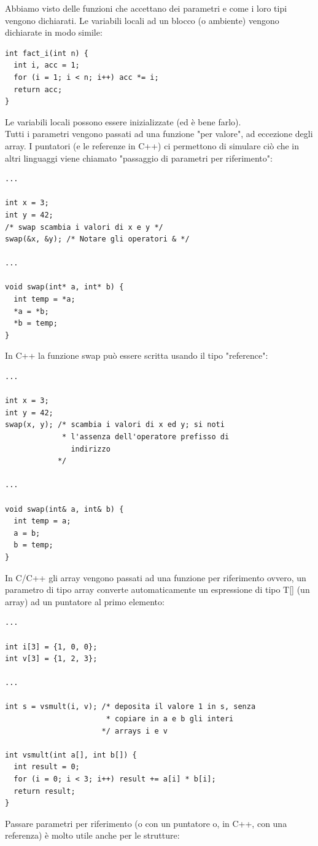 \documentclass[a4paper,12pt, oneside]{book}
\begin{document}
	Abbiamo visto delle funzioni che accettano dei parametri e
	come i loro tipi vengono dichiarati. Le variabili locali ad un blocco (o ambiente) vengono dichiarate in modo simile:
	\begin{verbatim}
int fact_i(int n) {
  int i, acc = 1;
  for (i = 1; i < n; i++) acc *= i;
  return acc;
}
\end{verbatim}
	Le variabili locali possono essere inizializzate (ed è bene farlo).\\
	Tutti i parametri vengono passati ad una funzione "per valore", ad eccezione degli array. I puntatori (e le referenze in C++) ci permettono di simulare ciò che in
	altri linguaggi viene chiamato "passaggio di parametri per riferimento":
	\begin{verbatim}
...

int x = 3;
int y = 42; 
/* swap scambia i valori di x e y */
swap(&x, &y); /* Notare gli operatori & */

...

void swap(int* a, int* b) {
  int temp = *a;
  *a = *b;
  *b = temp;
}
\end{verbatim}
	In C++ la funzione swap può essere scritta usando il tipo "reference":
	\begin{verbatim}
...

int x = 3;
int y = 42;
swap(x, y); /* scambia i valori di x ed y; si noti 
             * l'assenza dell'operatore prefisso di
               indirizzo 
            */

...

void swap(int& a, int& b) {
  int temp = a;
  a = b;
  b = temp;
}
\end{verbatim}
	In C/C++ gli array vengono passati ad una funzione per riferimento ovvero, un parametro di tipo array converte automaticamente un espressione di
	tipo T[] (un array) ad un puntatore al primo elemento:
	\begin{verbatim}
...

int i[3] = {1, 0, 0};
int v[3] = {1, 2, 3};

...

int s = vsmult(i, v); /* deposita il valore 1 in s, senza
                       * copiare in a e b gli interi
                      */ arrays i e v

int vsmult(int a[], int b[]) {
  int result = 0;
  for (i = 0; i < 3; i++) result += a[i] * b[i];
  return result;
}
\end{verbatim}
	Passare parametri per riferimento (o con un puntatore o, in C++, con una
	referenza) è molto utile anche per le strutture:
\end{document}
